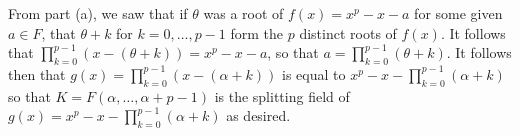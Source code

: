 \documentclass[11pt]{article}
\begin{document}
\begin{enumerate}[label=(\alph*)]
    From part (a), we saw that if $\theta$ was a root of $f(x) = x^p-x-a$ for some given $a\in F$, that $\theta+k$ for $k = 0,\dots,p-1$ form the $p$ distinct roots of $f(x)$. It follows that $\prod_{k=0}^{p-1}(x-(\theta + k)) = x^p-x-a$, so that $a = \prod_{k=0}^{p-1}(\theta +k)$. It follows then that $g(x) = \prod_{k=0}^{p-1}(x-(\alpha+k))$ is equal to $x^p-x-\prod_{k=0}^{p-1}(\alpha+k)$ so that $K =  F(\alpha,\dots,\alpha+p-1)$ is the splitting field of $g(x) = x^p-x-\prod_{k=0}^{p-1}(\alpha+k)$ as desired.
\end{enumerate}
\end{document}
